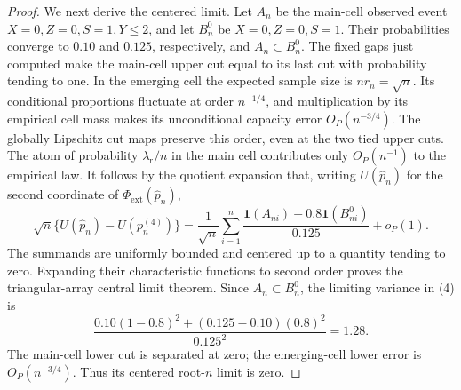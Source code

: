 \documentclass{article}
\begin{document}
\begin{proof}
We next derive the centered limit.  Let \(A_n\) be the main-cell observed event \(X=0,Z=0,S=1,Y\le2\), and let \(B_n^0\) be \(X=0,Z=0,S=1\).  Their probabilities converge to \(0.10\) and \(0.125\), respectively, and \(A_n\subset B_n^0\).  The fixed gaps just computed make the main-cell upper cut equal to its last cut with probability tending to one.  In the emerging cell the expected sample size is \(nr_n=\sqrt n\).  Its conditional proportions fluctuate at order \(n^{-1/4}\), and multiplication by its empirical cell mass makes its unconditional capacity error \(O_P(n^{-3/4})\).  The globally Lipschitz cut maps preserve this order, even at the two tied upper cuts.  The atom of probability \(\lambda_{\mathrm r}/n\) in the main cell contributes only \(O_P(n^{-1})\) to the empirical law.  It follows by the quotient expansion that, writing \(U(\widehat p_n)\) for the second coordinate of \(\Phi_{\mathrm{ext}}(\widehat p_n)\),
\[
\sqrt n\{U(\widehat p_n)-U(p_n^{(4)})\}
=\frac1{\sqrt n}\sum_{i=1}^n
\frac{\mathbf 1(A_{ni})-0.8\mathbf 1(B_{ni}^0)}{0.125}+o_P(1).
\tag{4}
\]
The summands are uniformly bounded and centered up to a quantity tending to zero.  Expanding their characteristic functions to second order proves the triangular-array central limit theorem.  Since \(A_n\subset B_n^0\), the limiting variance in (4) is
\[
\frac{0.10(1-0.8)^2+(0.125-0.10)(0.8)^2}{0.125^2}=1.28.
\]
The main-cell lower cut is separated at zero; the emerging-cell lower error is \(O_P(n^{-3/4})\).  Thus its centered root-\(n\) limit is zero.


\end{proof}
\end{document}
